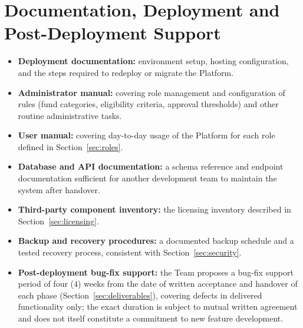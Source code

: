 \documentclass[11pt]{article}
\begin{document}
\section{Documentation, Deployment and Post-Deployment Support}
\label{sec:docs}
\begin{itemize}[leftmargin=1.4em, itemsep=3pt]
\item \textbf{Deployment documentation:} environment setup, hosting configuration, and the steps required to redeploy or migrate the Platform.
\item \textbf{Administrator manual:} covering role management and configuration of rules (fund categories, eligibility criteria, approval thresholds) and other routine administrative tasks.
\item \textbf{User manual:} covering day-to-day usage of the Platform for each role defined in Section~\ref{sec:roles}.
\item \textbf{Database and API documentation:} a schema reference and endpoint documentation sufficient for another development team to maintain the system after handover.
\item \textbf{Third-party component inventory:} the licensing inventory described in Section~\ref{sec:licensing}.
\item \textbf{Backup and recovery procedures:} a documented backup schedule and a tested recovery process, consistent with Section~\ref{sec:security}.
\item \textbf{Post-deployment bug-fix support:} the Team proposes a bug-fix support period of four (4) weeks from the date of written acceptance and handover of each phase (Section~\ref{sec:deliverables}), covering defects in delivered functionality only; the exact duration is subject to mutual written agreement and does not itself constitute a commitment to new feature development.
\end{itemize}

\end{document}
